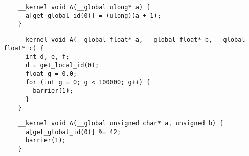 \newsavebox{\IntelPtrCompilerHang}
\begin{lrbox}{\IntelPtrCompilerHang}
  \hspace{1.5em}
  \begin{lstlisting}
    __kernel void A(__global ulong* a) {
      a[get_global_id(0)] = (ulong)(a + 1);
    }
  \end{lstlisting}
\end{lrbox}


\newsavebox{\IntelOptCompilerHang}
\begin{lrbox}{\IntelOptCompilerHang}
  \hspace{1.5em}
  \begin{lstlisting}
    __kernel void A(__global float* a, __global float* b, __global float* c) {
      int d, e, f;
      d = get_local_id(0);
      float g = 0.0;
      for (int g = 0; g < 100000; g++) {
        barrier(1);
      }
    }
  \end{lstlisting}
\end{lrbox}

\newsavebox{\XeonPhiSpin}
\begin{lrbox}{\XeonPhiSpin}
  \hspace{1.5em}
  \begin{lstlisting}
    __kernel void A(__global unsigned char* a, unsigned b) {
      a[get_global_id(0)] %= 42;
      barrier(1);
    }
  \end{lstlisting}
\end{lrbox}

